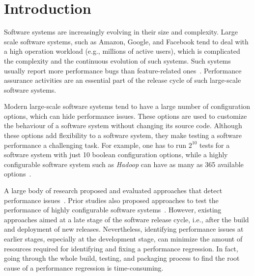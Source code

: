 
\section{Introduction}
\label{sec:intro}
Software systems are increasingly evolving in their size and complexity.
Large scale software systems, such as Amazon, Google, and Facebook tend to deal with a high operation workload (e.g., millions of active users), which is complicated the complexity and the continuous evolution of such systems. Such systems usually report more performance bugs than feature-related ones~\cite{weyuker2000experience}.
Performance assurance activities are an essential part of the release cycle of such large-scale software systems.

Modern large-scale software systems tend to have a large number of configuration options, which can hide performance issues. %
These options are used to customize the behaviour of a software system without changing its source code. Although these options add flexibility to a software system, they make testing a software performance a challenging task. For example, one has to run $2^
{10}$ tests for a software system with just 10 boolean configuration options, while a highly configurable software system such as \emph{Hadoop} can have as many as 365 available options~\cite{tse}. 
 
A large body of research proposed and evaluated approaches that detect performance issues~\cite{Nguyen:2012:ADP,nguyen2011automated,Nguyen:2014:ICS,foo2010mining,DBLP:conf/icse/FooJAHZF15}. Prior studies also proposed approaches to test the performance of highly configurable software systems~\cite{DBLP:journals/dt/SaxenaFHMYM00,wu2010performance,DBLP:journals/ese/HalinNADPB19}. However, existing approaches aimed at a late stage of the software release cycle, i.e., after the build and deployment of new releases. Nevertheless, identifying performance issues at earlier stages, especially at the development stage, can minimize the amount of resources required for identifying and fixing a performance regression. In fact, going through the whole build, testing, and packaging process to find the root cause of a performance regression is time-consuming. 



